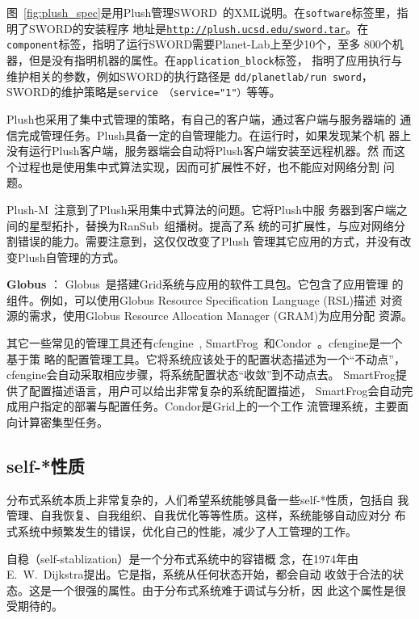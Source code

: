 图~\ref{fig:plush_spec}是用Plush管理SWORD~\cite{sword_worlds,
sword_toit}的XML说明。在\texttt{software}标签里，指明了SWORD的安装程序
地址是\texttt{\url{http://plush.ucsd.edu/sword.tar}}。在
\texttt{component}标签，指明了运行SWORD需要Planet-Lab上至少10个，至多
800个机器，但是没有指明机器的属性。在\texttt{application\_block}标签，
指明了应用执行与维护相关的参数，例如SWORD的执行路径是
\texttt{dd\-/planetlab\-/run sword}，SWORD的维护策略是\texttt{service
（service="1"）}等等。

Plush也采用了集中式管理的策略，有自己的客户端，通过客户端与服务器端的
通信完成管理任务。Plush具备一定的自管理能力。在运行时，如果发现某个机
器上没有运行Plush客户端，服务器端会自动将Plush客户端安装至远程机器。然
而这个过程也是使用集中式算法实现，因而可扩展性不好，也不能应对网络分割
问题。

Plush-M~\cite{plush-m}注意到了Plush采用集中式算法的问题。它将Plush中服
务器到客户端之间的星型拓扑，替换为RanSub~\cite{ransub}组播树。提高了系
统的可扩展性，与应对网络分割错误的能力。需要注意到，这仅仅改变了Plush
管理其它应用的方式，并没有改变Plush自管理的方式。

\textbf{Globus} ：
Globus~\cite{globus}是搭建Grid系统与应用的软件工具包。它包含了应用管理
的组件。例如，可以使用Globus Resource Specification Language (RSL)描述
对资源的需求，使用Globus Resource Allocation Manager (GRAM)为应用分配
资源。

其它一些常见的管理工具还有cfengine~\cite{cfengine},
SmartFrog~\cite{smartfrog}和Condor~\cite{condor}。cfengine是一个基于策
略的配置管理工具。它将系统应该处于的配置状态描述为一个“不动点”，
cfengine会自动采取相应步骤，将系统配置状态“收敛”到不动点去。
SmartFrog提供了配置描述语言，用户可以给出非常复杂的系统配置描述，
SmartFrog会自动完成用户指定的部署与配置任务。Condor是Grid上的一个工作
流管理系统，主要面向计算密集型任务。




\subsection{self-*性质}
\label{sec:related:selfstart}


分布式系统本质上非常复杂的，人们希望系统能够具备一些self-*性质，包括自
我管理、自我恢复、自我组织、自我优化等等性质。这样，系统能够自动应对分
布式系统中频繁发生的错误，优化自己的性能，减少了人工管理的工作。

自稳\cite{Dijkstra1974}（self-stablization）是一个分布式系统中的容错概
念，在1974年由E.\ W.\ Dijkstra提出。它是指，系统从任何状态开始，都会自动
收敛于合法的状态。这是一个很强的属性。由于分布式系统难于调试与分析，因
此这个属性是很受期待的。

